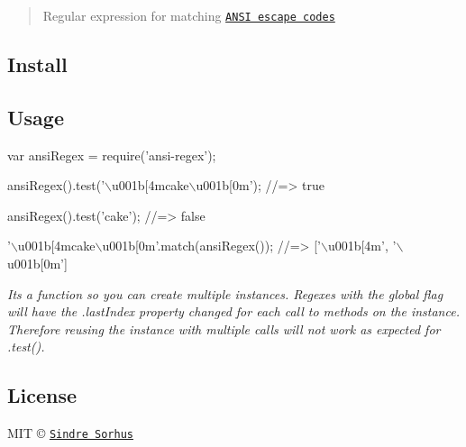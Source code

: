 \begin{quote}
Regular expression for matching \href{http://en.wikipedia.org/wiki/ANSI_escape_code}{\tt A\+N\+SI escape codes} \end{quote}


\subsection*{Install}




\subsection*{Usage}


\begin{DoxyCode}
var ansiRegex = require('ansi-regex');

ansiRegex().test('\(\backslash\)u001b[4mcake\(\backslash\)u001b[0m');
//=> true

ansiRegex().test('cake');
//=> false

'\(\backslash\)u001b[4mcake\(\backslash\)u001b[0m'.match(ansiRegex());
//=> ['\(\backslash\)u001b[4m', '\(\backslash\)u001b[0m']
\end{DoxyCode}


{\itshape It\textquotesingle{}s a function so you can create multiple instances. Regexes with the global flag will have the {\ttfamily .last\+Index} property changed for each call to methods on the instance. Therefore reusing the instance with multiple calls will not work as expected for {\ttfamily .test()}.}

\subsection*{License}

M\+IT © \href{http://sindresorhus.com}{\tt Sindre Sorhus} 